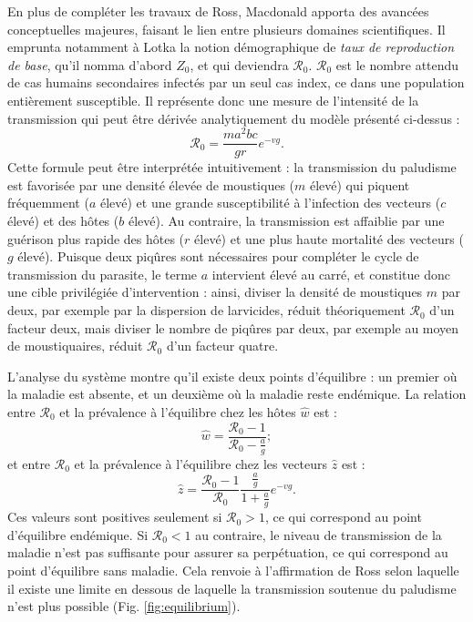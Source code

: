 En plus de compléter les travaux de Ross, Macdonald apporta des avancées  conceptuelles majeures, faisant le lien entre plusieurs domaines scientifiques.
Il emprunta notamment à Lotka la notion démographique de {\em taux de reproduction de base}, qu'il nomma d'abord $Z_0$, et qui deviendra $\mathcal{R}_0$. $\mathcal{R}_0$ est le nombre attendu de cas humains secondaires infectés par un seul cas index, ce dans une population entièrement susceptible.
Il représente donc une mesure de l'intensité de la transmission qui peut être dérivée analytiquement du modèle présenté ci-dessus :
\begin{equation}
\mathcal{R}_0 = \frac{ma^2bc}{gr}e^{-vg}.
\end{equation}
Cette formule peut être interprétée intuitivement : la transmission du paludisme est favorisée par une densité élevée de moustiques ($m$ élevé) qui piquent fréquemment ($a$ élevé) et une grande susceptibilité à l'infection des vecteurs ($c$ élevé) et des hôtes ($b$ élevé).
Au contraire, la transmission est affaiblie par une guérison plus rapide des hôtes ($r$ élevé) et une plus haute mortalité des vecteurs ($g$ élevé).
Puisque deux piqûres sont nécessaires pour compléter le cycle de transmission du parasite, le terme $a$ intervient élevé au carré, et constitue donc une cible privilégiée d'intervention : ainsi, diviser la densité de moustiques $m$ par deux, par exemple par la dispersion de larvicides, réduit théoriquement $\mathcal{R}_0$ d'un facteur deux, mais diviser le nombre de piqûres par deux, par exemple au moyen de moustiquaires, réduit $\mathcal{R}_0$ d'un facteur quatre.

L'analyse du système montre qu'il existe deux points d'équilibre : un premier où la maladie est absente, et un deuxième où la maladie reste endémique. La relation entre $\mathcal{R}_0$ et la prévalence à l'équilibre chez les hôtes $\hat{w}$ est :
\begin{equation}
\label{eq:equi1}
\hat{w} = \frac{\mathcal{R}_0-1}{\mathcal{R}_0-\frac{a}{g}};
\end{equation}
et entre $\mathcal{R}_0$ et la prévalence à l'équilibre chez les vecteurs $\hat{z}$ est :
\begin{equation}
\label{eq:equi2}
\hat{z} = \frac{\mathcal{R}_0-1}{\mathcal{R}_0}\frac{\frac{a}{g}}{1+\frac{a}{g}}e^{-vg}.
\end{equation}
Ces valeurs sont positives seulement si $\mathcal{R}_0>1$, ce qui correspond au point d'équilibre endémique. Si $\mathcal{R}_0<1$ au contraire, le niveau de transmission de la maladie n'est pas suffisante pour assurer sa perpétuation, ce qui correspond au point d'équilibre sans maladie. Cela renvoie à l'affirmation de Ross selon laquelle il existe une limite en dessous de laquelle la transmission soutenue du paludisme n'est plus possible (Fig. \ref{fig:equilibrium}).

